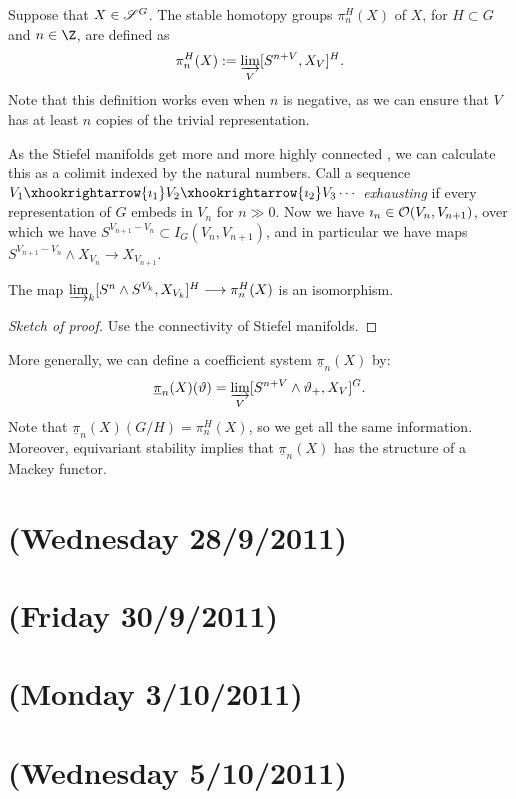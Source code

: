 \documentclass[11pt]{article}
\newcommand{\NewLecture}[3]{\section{#1 {\small(#2/#3/2011)}}}
\begin{document}
Suppose that $X\in\scrS^G$. The stable homotopy groups $\pi_n^H(X)$ of $X$, for $H\subset G$ and $n\in\Z$, are defined as
\[\pi_n^H(X):=\varinjlim_{V}[S^{n+V},X_V]^H.\]
Note that this definition works even when $n$ is negative, as we can ensure that $V$ has at least $n$ copies of the trivial representation.
\begin{rmk*}
As the Stiefel manifolds get more and more highly connected , we can calculate this as a colimit indexed by the natural numbers. Call a sequence $V_1\xhookrightarrow{\imath_1}V_2\xhookrightarrow{\imath_2}V_3\cdots$ \emph{exhausting} if every representation of $G$ embeds in $V_n$ for $n\gg0$. Now we have $\imath_n\in\calO(V_n,V_{n+1})$, over which we have $S^{V_{n+1}-V_n}\subset I_G(V_n,V_{n+1})$, and in particular we have maps $S^{V_{n+1}-V_n}\wedge X_{V_n}\to X_{V_{n+1}}$.
\begin{prop*}
The map $\varinjlim_k[S^n\wedge S^{V_k},X_{V_k}]^H\to \pi_n^H(X)$ is an isomorphism.
\end{prop*}
\begin{proof}[Sketch of proof]
Use the connectivity of Stiefel manifolds. 
\end{proof}
\end{rmk*}
More generally, we can define a coefficient system $\underline \pi_n(X)$ by:
\[\underline\pi_n(X)(\vartheta)=\varinjlim_V[S^{n+V}\wedge \vartheta_+,X_V]^G.\]
Note that $\underline\pi_n(X)(G/H)=\pi_n^H(X)$, so we get all the same information. Moreover, equivariant stability implies that $\underline\pi_n(X)$ has the structure of a Mackey functor. 

\NewLecture{}{Wednesday 28}{9}
\NewLecture{}{Friday 30}{9}
\NewLecture{}{Monday 3}{10}
\NewLecture{}{Wednesday 5}{10}
\end{document}
